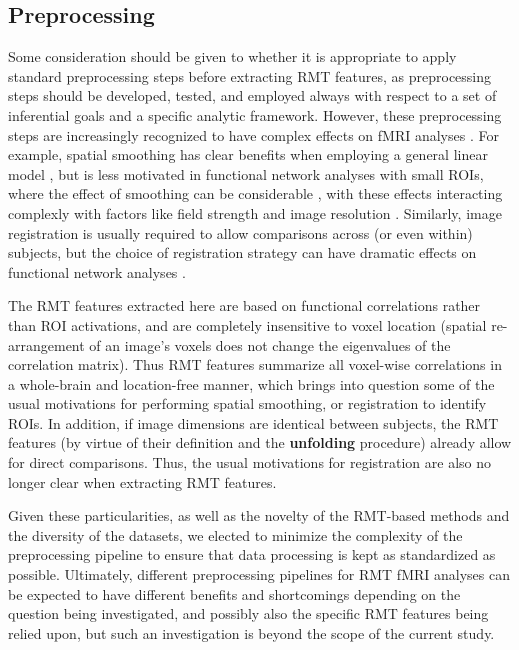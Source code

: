 \documentclass[NETN,manuscript]{stjour-new}
\begin{document}
\subsection{Preprocessing}
Some consideration should be given to whether it is appropriate to apply standard preprocessing
steps before extracting RMT features, as preprocessing steps should be developed, tested, and
employed always with respect to a set of inferential goals and a specific analytic framework.
However, these preprocessing steps are increasingly recognized to have complex effects on fMRI
analyses \citep{parkerBenefitSliceTiming2019}. For example, spatial smoothing has clear benefits
when employing a general linear model
\citep{miklEffectsSpatialSmoothing2008,alakorkkoEffectsSpatialSmoothing2017,worsleyAnalysisFMRITimeSeries1995},
but is less motivated in functional network analyses with small ROIs, where the effect of smoothing
can be considerable
\citep{alakorkkoEffectsSpatialSmoothing2017,goelmanMaximizingNegativeCorrelations2014,trianaEffectsSpatialSmoothing2020},
with these effects interacting complexly with factors like field strength and image resolution
\citep{triantafyllouEffectSpatialSmoothing2006}. Similarly, image registration is usually required
to allow comparisons across (or even within) subjects, but the choice of registration strategy can
have dramatic effects on functional network analyses \citep{magalhaesImpactNormalizationSegmentation2014}.

The RMT features extracted here are based on functional correlations rather than ROI activations,
and are completely insensitive to voxel location (spatial re-arrangement of an image’s voxels does
not change the eigenvalues of the correlation matrix). Thus RMT features summarize all voxel-wise
correlations in a whole-brain and location-free manner, which brings into question some of the usual
motivations for performing spatial smoothing, or registration to identify ROIs. In addition, if
image dimensions are identical between subjects, the RMT features (by virtue of their definition and
the \textbf{unfolding} procedure) already allow for direct comparisons. Thus, the usual motivations for
registration are also no longer clear when extracting RMT features.

Given these particularities, as well as the novelty of the RMT-based methods and the diversity of
the datasets, we elected to minimize the complexity of the preprocessing pipeline to ensure that
data processing is kept as standardized as possible. Ultimately, different preprocessing pipelines
for RMT fMRI analyses can be expected to have different benefits and shortcomings depending on the
question being investigated, and possibly also the specific RMT features being relied upon, but such
an investigation is beyond the scope of the current study.
\end{document}
